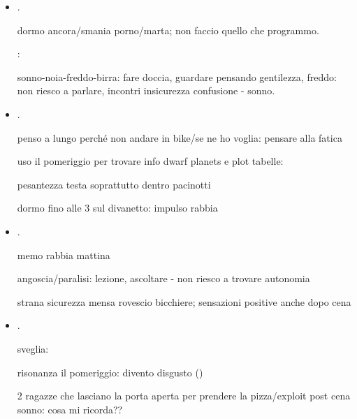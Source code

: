 \begin{itemize}
condizione: 

.

non ho la prontezza smascherare coazione mangiare tofu

workout: qual \'e obiettivo? come posso descidere coscientemente?

fumo/sveniere, situazione angoscia bias

\item {}.

dormo ancora/smania porno/marta;  non faccio quello che programmo.


: 

sonno-noia-freddo-birra: fare doccia, guardare pensando gentilezza, freddo: non riesco a parlare, incontri insicurezza confusione - sonno.

\item {}.

penso a lungo perch\'e non andare in bike/se ne ho voglia: pensare alla fatica

uso il pomeriggio per trovare info dwarf planets e plot tabelle: 

pesantezza testa soprattutto dentro pacinotti

dormo fino alle 3 sul divanetto: impulso rabbia 

\item {}.

memo rabbia mattina

angoscia/paralisi: lezione, ascoltare - non riesco a trovare autonomia

strana sicurezza mensa rovescio bicchiere; sensazioni positive anche dopo cena

\item {}.

sveglia: 

risonanza il pomeriggio: divento disgusto ()

2 ragazze che lasciano la porta aperta per prendere la pizza/exploit post cena sonno: cosa mi ricorda??


\end{itemize}
